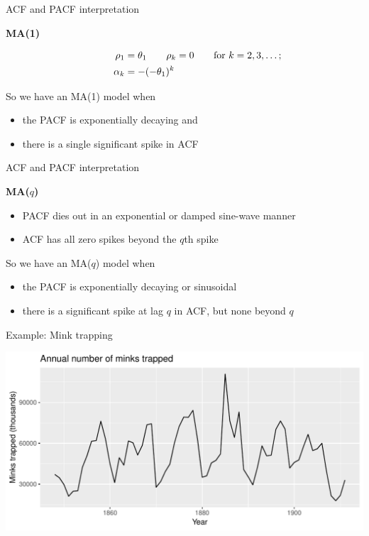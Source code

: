 \documentclass[14pt,ignorenonframetext,]{beamer}
\providecommand{\tightlist}{%
  \setlength{\itemsep}{0pt}\setlength{\parskip}{0pt}}
\begin{document}
\begin{frame}{ACF and PACF interpretation}

\textbf{MA(1)}

\begin{align*}
\hspace*{1cm}\rho_1 &= \theta_1\qquad \rho_k = 0\qquad\text{for $k=2,3,\dots$};\\
\alpha_k &= -(-\theta_1)^k
\end{align*}

So we have an MA(1) model when

\begin{itemize}
\tightlist
\item
  the PACF is exponentially decaying and
\item
  there is a single significant spike in ACF
\end{itemize}

\end{frame}

\begin{frame}{ACF and PACF interpretation}

\textbf{MA(\(q\))}

\begin{itemize}
\tightlist
\item
  PACF dies out in an exponential or damped sine-wave manner
\item
  ACF has all zero spikes beyond the \(q\)th spike
\end{itemize}

So we have an MA(\(q\)) model when

\begin{itemize}
\tightlist
\item
  the PACF is exponentially decaying or sinusoidal
\item
  there is a significant spike at lag \(q\) in ACF, but none beyond
  \(q\)
\end{itemize}

\end{frame}

\begin{frame}{Example: Mink trapping}

\includegraphics{week_5_arima_files/figure-beamer/unnamed-chunk-29-1.pdf}

\end{frame}
\end{document}

